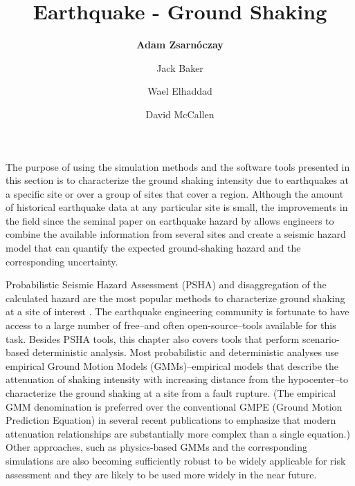 %
%
%

\title{Earthquake - Ground Shaking}
\label{chp:eq_shaking}
\author{
    \textbf{Adam Zsarnóczay}
    \and Jack Baker 
    \and Wael Elhaddad
    \and David McCallen}
\tocauthor{}
%
%
\maketitle
\label{chapter:haz_shaking}

The purpose of using the simulation methods and the software tools presented in this section is to characterize the ground shaking intensity due to earthquakes at a specific site or over a group of sites that cover a region. Although the amount of historical earthquake data at any particular site is small, the improvements in the field since the seminal paper on earthquake hazard by \citet{cornell1968engineering} allows engineers to combine the available information from several sites and create a seismic hazard model that can quantify the expected ground-shaking hazard and the corresponding uncertainty. 

Probabilistic Seismic Hazard Assessment (PSHA) and disaggregation of the calculated hazard are the most popular methods to characterize ground shaking at a site of interest \citep{bazzurro1999disaggregation}. The earthquake engineering community is fortunate to have access to a large number of free--and often open-source--tools available for this task. Besides PSHA tools, this chapter also covers tools that perform scenario-based deterministic analysis. Most probabilistic and deterministic analyses use empirical Ground Motion Models (GMMs)--empirical models that describe the attenuation of shaking intensity with increasing distance from the hypocenter--to characterize the ground shaking at a site from a fault rupture. (The empirical GMM denomination is preferred over the conventional GMPE (Ground Motion Prediction Equation) in several recent publications to emphasize that modern attenuation relationships are substantially more complex than a single equation.) Other approaches, such as physics-based GMMs and the corresponding simulations are also becoming sufficiently robust to be widely applicable for risk assessment and they are likely to be used more widely in the near future. 

